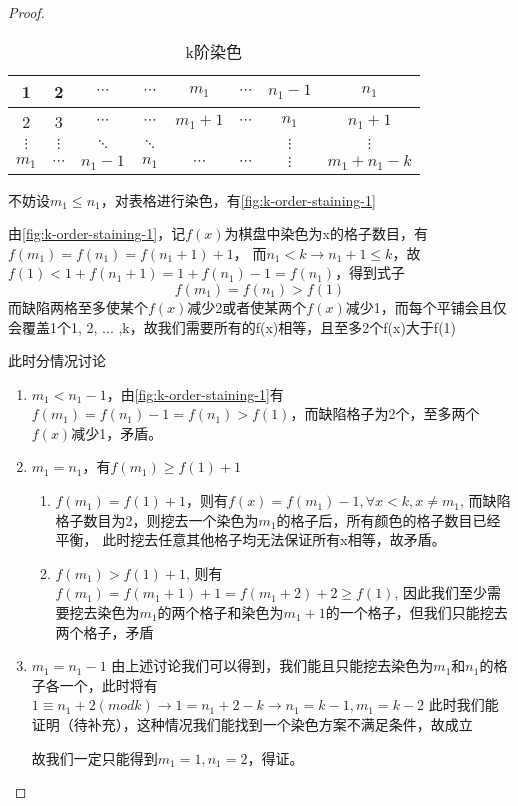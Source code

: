 \begin{proof}
    \begin{table}[ht]
        \centering
        \caption{k阶染色}
        \begin{tabular}{|c|c|c|c|c|c|c|c|}
            \hline
            1        & 2        & $\cdots$ & $\cdots$ & $m_1$     & $\cdots$ & $n_1 - 1$ & $n_1$          \\
            \hline
            2        & 3        & $\cdots$ & $\cdots$ & $m_1 + 1$ & $\cdots$ & $n_1$     & $n_1 + 1$      \\
            \hline
            $\vdots$ & $\vdots$ & $\ddots$ & $\ddots$ &           &          & $\vdots$  & $\vdots$       \\
            \hline
            $m_1$    & $\cdots$ & $n_1-1$  & $n_1$    & $\cdots$  & $\cdots$ & $\vdots$  & $m_1 + n_1 -k$ \\
            \hline
        \end{tabular}
        \label{fig:k-order-staining-example}
    \end{table}
    不妨设$m_1 \le n_1$，对表格进行染色，有\ref*{fig:k-order-staining-1}

    由\ref*{fig:k-order-staining-1}，记$f(x)$为棋盘中染色为x的格子数目，有$f(m_1) = f(n_1) = f(n_1 + 1) + 1$，
    而$n_1 < k  \rightarrow n_1 + 1 \le k$，故$f(1) < 1 + f(n_1 + 1) = 1 + f(n_1) - 1 = f(n_1)$，得到式子
    \begin{equation}
        \label{eq1}
        f(m_1) = f(n_1) > f(1)
    \end{equation}
    而缺陷两格至多使某个$f(x)$减少2或者使某两个$f(x)$减少1，而每个平铺会且仅会覆盖1个1, 2, ... ,k，故我们需要所有的f(x)相等，且至多2个f(x)大于f(1)

    此时分情况讨论

    \begin{enumerate}
        \item $m_1 < n_1 - 1$，由\ref*{fig:k-order-staining-1}有$f(m_1) = f(n_1) - 1 = f(n_1) > f(1)$，而缺陷格子为2个，至多两个$f(x)$减少1，矛盾。
        \item $m_1 = n_1$，有$f(m_1) \ge f(1) + 1$
              \begin{enumerate}
                  \item $f(m_1) = f(1) + 1$，则有$f(x) = f(m_1) - 1, \forall x < k, x \neq m_1$, 而缺陷格子数目为2，则挖去一个染色为$m_1$的格子后，所有颜色的格子数目已经平衡，
                        此时挖去任意其他格子均无法保证所有x相等，故矛盾。
                  \item $f(m_1) > f(1) + 1$, 则有$f(m_1) = f(m_1+1) + 1 = f(m_1 + 2) + 2\ge f(1)$, 因此我们至少需要挖去染色为$m_1$的两个格子和染色为$m_1 + 1$的一个格子，但我们只能挖去两个格子，矛盾
              \end{enumerate}
        \item $m_1 = n_1 - 1$ 由上述讨论我们可以得到，我们能且只能挖去染色为$m_1$和$n_1$的格子各一个，此时将有$1 \equiv n_1 + 2 (mod k) \rightarrow 1 = n_1 + 2 - k \rightarrow n_1 = k - 1, m_1 = k - 2$
              此时我们能证明（待补充），这种情况我们能找到一个染色方案不满足条件，故成立

              故我们一定只能得到$m_1 =1, n_1 = 2$，得证。
    \end{enumerate}
\end{proof}